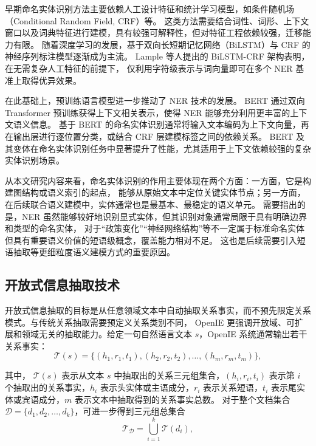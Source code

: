 早期命名实体识别方法主要依赖人工设计特征和统计学习模型，如条件随机场（Conditional Random Field, CRF）等。
这类方法需要结合词性、词形、上下文窗口以及词典特征进行建模，具有较强可解释性，但对特征工程依赖较强，迁移能力有限。
随着深度学习的发展，基于双向长短期记忆网络（BiLSTM）与 CRF 的神经序列标注模型逐渐成为主流\cite{lample2016neural}。
Lample 等人提出的 BiLSTM-CRF 架构表明，在无需复杂人工特征的前提下，
仅利用字符级表示与词向量即可在多个 NER 基准上取得优异效果。


在此基础上，预训练语言模型进一步推动了 NER 技术的发展。
BERT 通过双向 Transformer 预训练获得上下文相关表示，使得 NER 能够充分利用更丰富的上下文语义信息。
基于 BERT 的命名实体识别通常将输入文本编码为上下文向量，再在输出层进行逐位置分类，或结合 CRF 层建模标签之间的依赖关系。
BERT 及其变体在命名实体识别任务中显著提升了性能，尤其适用于上下文依赖较强的复杂实体识别场景。

从本文研究内容来看，命名实体识别的作用主要体现在两个方面：一方面，它是构建图结构或语义索引的起点，
能够从原始文本中定位关键实体节点；另一方面，在后续联合语义建模中，实体通常也是最基本、最稳定的语义单元。
需要指出的是，NER 虽然能够较好地识别显式实体，但其识别对象通常局限于具有明确边界和类型的命名实体，
对于“政策变化”“神经网络结构”等不一定属于标准命名实体但具有重要语义价值的短语级概念，覆盖能力相对不足。
这也是后续需要引入短语抽取等更细粒度语义建模方式的重要原因。

\subsection{开放式信息抽取技术}

开放式信息抽取的目标是从任意领域文本中自动抽取关系事实，而不预先限定关系模式。与传统关系抽取需要预定义关系类别不同，
OpenIE 更强调开放域、可扩展和领域无关的抽取能力。给定一句自然语言文本 $s$，OpenIE 系统通常输出若干关系事实：
\begin{equation}
\mathcal{T}(s) = \{(h_1, r_1, t_1), (h_2, r_2, t_2), \dots, (h_m, r_m, t_m)\},
\end{equation}

\noindent 其中， $\mathcal{T}(s)$ 表示从文本 $s$ 中抽取出的关系三元组集合，$(h_i, r_i, t_i)$ 表示第 $i$ 个抽取出的关系事实，$h_i$ 表示头实体或主语成分，$r_i$ 表示关系短语，$t_i$ 表示尾实体或宾语成分，$m$ 表示文本中抽取得到的关系事实总数。
对于整个文档集合 $\mathcal{D} = \{d_1, d_2, \dots, d_k\}$，可进一步得到三元组总集合
\begin{equation}
\mathcal{T}_{\mathcal{D}} = \bigcup_{i=1}^{k} \mathcal{T}(d_i),
\end{equation}

